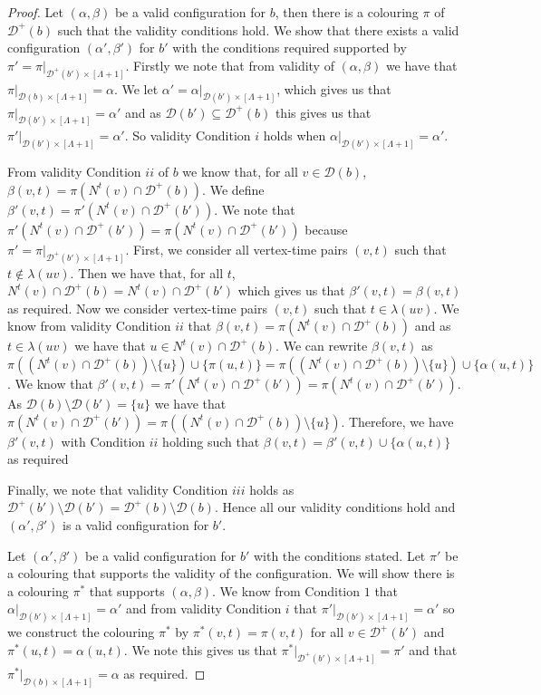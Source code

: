 \documentclass[runningheads]{llncs}
\begin{document}
\begin{proof}
Let $(\alpha,\beta)$ be a valid configuration for $b$, then there is a colouring $\pi$ of $\mathcal{D}^+(b)$ such that the validity conditions hold. 
We show that there exists a valid configuration $(\alpha',\beta')$ for $b'$ with the conditions required supported by $\pi'=\pi|_{\mathcal{D}^+(b') \times [\Lambda +1]}$.
Firstly we note that from validity of $(\alpha,\beta)$ we have that $\pi|_{\mathcal{D}(b) \times [\Lambda+1]}=\alpha$.
We let $\alpha'=\alpha|_{\mathcal{D}(b')\times[\Lambda+1]}$, which gives us that
 $\pi|_{\mathcal{D}(b')\times[\Lambda+1]}=\alpha'$ and as $\mathcal{D}(b') \subseteq \mathcal{D}^+(b)$ this gives us that $\pi'|_{\mathcal{D}(b')\times[\Lambda+1]}=\alpha'$.
So validity Condition $i$ holds when $\alpha|_{\mathcal{D}(b')\times[\Lambda+1]}=\alpha'$.

From validity Condition $ii$ of $b$ we know that, for all $v \in \mathcal{D}(b)$, $\beta(v,t)=\pi(N^t(v) \cap\mathcal{D}^+(b))$. 
We define $\beta'(v,t)=\pi'(N^t(v) \cap \mathcal{D}^+(b'))$. We note that $\pi'(N^t(v) \cap\mathcal{D}^+(b'))=\pi(N^t(v) \cap\mathcal{D}^+(b'))$ because $\pi'=\pi|_{\mathcal{D}^+(b') \times [\Lambda +1]}$.
First, we consider all vertex-time pairs $(v,t)$ such that $t \notin \lambda(uv)$. 
Then we have that, for all $t$, $N^t(v) \cap \mathcal{D}^+(b)=N^t(v)\cap \mathcal{D}^+(b')$ which gives us that $\beta'(v,t)=\beta(v,t)$ as required.
Now we consider vertex-time pairs $(v,t)$ such that $t \in \lambda(uv)$. We know from validity Condition $ii$ that $\beta(v,t)=\pi(N^t(v)\cap\mathcal{D}^+(b))$ and as $t \in \lambda(uv)$ we have that $u \in N^t(v) \cap \mathcal{D}^+(b)$. We can rewrite $\beta(v,t)$ as $\pi((N^t(v)\cap\mathcal{D}^+(b))\setminus\{u\}) \cup\{ \pi(u,t)\}= \pi((N^t(v)\cap\mathcal{D}^+(b))\setminus\{u\}) \cup \{\alpha(u,t)\}$.
We know that $\beta'(v,t)=\pi'(N^t(v) \cap \mathcal{D}^+(b'))=\pi(N^t(v) \cap \mathcal{D}^+(b'))$. As $\mathcal{D}(b) \setminus \mathcal{D}(b')=\{u\}$ we have that $\pi(N^t(v) \cap \mathcal{D}^+(b'))=\pi((N^t(v) \cap \mathcal{D}^+(b)) \setminus \{u\})$. 
Therefore, we have $\beta'(v,t)$ with Condition $ii$ holding such that $\beta(v,t)=\beta'(v,t)\cup \{\alpha(u,t)\}$ as required

Finally, we note that validity Condition $iii$ holds as $\mathcal{D}^+(b') \setminus \mathcal{D}(b') = \mathcal{D}^+(b) \setminus \mathcal{D}(b)$.
Hence all our validity conditions hold and $(\alpha',\beta')$ is a valid configuration for $b'$.


Let $(\alpha',\beta')$ be a valid configuration for $b'$ with the conditions stated. Let $\pi'$ be a colouring that supports the validity of the configuration. We will show there is a colouring $\pi^*$ that supports $(\alpha,\beta)$. We know from Condition $1$ that $\alpha|_{\mathcal{D}(b')\times[\Lambda+1]}=\alpha'$ and from validity Condition $i$ that $\pi'|_{\mathcal{D}(b') \times [\Lambda+1]}=\alpha'$ so we construct the colouring $\pi^*$ by $\pi^*(v,t)=\pi(v,t)$ for all $v \in \mathcal{D}^+(b')$ and $\pi^*(u,t)=\alpha(u,t)$.
We note this gives us that $\pi^*|_{\mathcal{D}^+(b') \times [\Lambda+1]}=\pi'$
and that $\pi^*|_{\mathcal{D}(b) \times [\Lambda+1]}=\alpha$ as required.


\end{proof}
\end{document}
